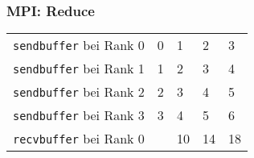\documentclass{beamer}
\begin{document}
\begin{frame}
  \frametitle{MPI: Reduce}
  \begin{table}
    \begin{tabular}{r|l l l l}
      \lstinline{sendbuffer} bei Rank 0 &       0 & 1 & 2 & 3 \\
      \lstinline{sendbuffer} bei Rank 1 &       1 & 2 & 3 & 4\\
      \lstinline{sendbuffer} bei Rank 2 &       2 & 3 & 4 & 5 \\
      \lstinline{sendbuffer} bei Rank 3 &       3 & 4 & 5 & 6 \\
      \lstinline{recvbuffer} bei Rank 0 &\pause 6 & 10 & 14 & 18 \\
    \end{tabular}
  \end{table}
\end{frame}
\end{document}
